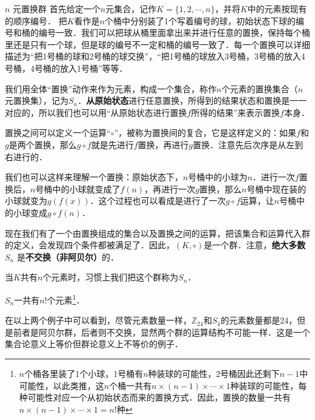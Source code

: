 \begin{example}{$n$ 元置换群}\label{Group_ex3}
首先给定一个$n$元集合，记作$K=\{1,2, \cdots, n\}$，并将$K$中的元素按现有的顺序编号． 把$K$看作是$n$个桶中分别装了1个写着编号的球，初始状态下球的编号和桶的编号一致．我们可以把球从桶里面拿出来并进行任意的置换，保持每个桶里还是只有一个球，但是球的编号不一定和桶的编号一致了．每一个置换可以详细描述为“把1号桶的球和2号桶的球交换”，“把1号桶的球放入3号桶，3号桶的放入4号桶，4号桶的放入1号桶”等等．

我们用全体“置换”动作来作为元素，构成一个集合，称作$n$个元素的置换集合（$n$元置换集），记为$S_n$．\textbf{从原始状态}进行任意置换，所得到的结果状态和置换是一一对应的，所以我们也可以用“从原始状态进行置换$f$所得的结果”来表示置换$f$本身．

置换之间可以定义一个运算“$\circ$”，被称为置换间的复合，它是这样定义的：如果$f$和$g$是两个置换，那么$g\circ f$就是先进行$f$置换，再进行$g$置换．注意先后次序是从左到右进行的．

我们也可以这样来理解一个置换：原始状态下，$n$号桶中的小球为$n$．进行一次$f$置换后，$n$号桶中的小球就变成了$f(n)$，再进行一次$g$置换，那么$n$号桶中现在装的小球就变为$g(f(x))$．这个过程也可以看成是进行了一次$g\circ f$运算，让$n$号桶中的小球变成$g\circ f(n)$．

现在我们有了一个由置换组成的集合以及置换之间的运算，把该集合和运算代入群的定义，会发现四个条件都被满足了．因此，$(K, \circ)$是一个群．注意，\textbf{绝大多数} $S_n$ 是\textbf{不交换（非阿贝尔）}的．

当$K$共有$n$个元素时，习惯上我们把这个群称为$S_n$．

$S_n$一共有$n!$个元素\footnote{$n$个桶各里装了1个小球，1号桶有$n$种装球的可能性，2号桶因此还剩下$n-1$中可能性，以此类推，这$n$个桶一共有$n\times(n-1)\times\cdots\times1$种装球的可能性，每种可能性对应一个从初始状态而来的置换方式．因此，置换的数量一共有$n\times(n-1)\times\cdots\times1=n!$种}．
\end{example}

在以上两个例子中可以看到，尽管元素数量一样，$\mathbb{Z}_{24}$和$S_4$的元素数量都是24，但是前者是阿贝尔群，后者则不交换，显然两个群的运算结构不可能一样．这是一个集合论意义上等价但群论意义上不等价的例子．

